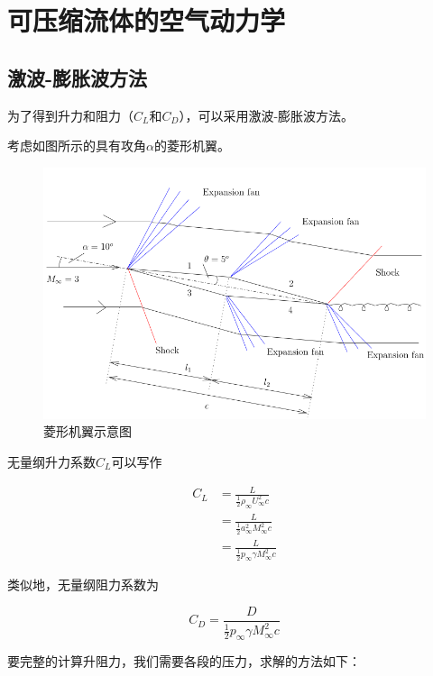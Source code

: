 \section{可压缩流体的空气动力学}

\subsection{激波-膨胀波方法}

为了得到升力和阻力（$C_L$和$C_D$），可以采用激波-膨胀波方法。

考虑如图所示的具有攻角$\alpha$的菱形机翼。

\begin{figure}[!ht]
    \centering
    \includegraphics[width=\linewidth]{figures/16.png}
    \caption{菱形机翼示意图}
    \label{16}
\end{figure}

无量纲升力系数$C_L$可以写作

\begin{align*}
    C_L&=\frac{L}{\frac{1}{2}\rho_\infty U_\infty^2 c}\\ 
    &=\frac{L}{\frac{1}{2}a_\infty^2M_\infty^2 c}\\ 
    &=\frac{L}{\frac{1}{2}p_\infty \gamma M_\infty^2c}
\end{align*}

类似地，无量纲阻力系数为

\begin{equation*}
    C_{D}=\frac{D}{\frac{1}{2} p_{\infty} \gamma M_{\infty}^{2} c}
\end{equation*}

要完整的计算升阻力，我们需要各段的压力，求解的方法如下：


